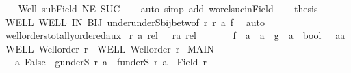 \begin{isabellebody}
\ \ \isamarkupfalse%
\ Well{\isacharprime}{\kern0pt}\ subField\ NE\ SUC\isanewline
\ \ \isamarkupfalse%
\ {\isacharparenleft}{\kern0pt}auto\ simp\ add{\isacharcolon}{\kern0pt}\ wo{\isacharunderscore}{\kern0pt}rel{\isachardot}{\kern0pt}suc{\isacharunderscore}{\kern0pt}inField{\isacharparenright}{\kern0pt}\isanewline
\ \ \isamarkupfalse%
\ {\isacharquery}{\kern0pt}thesis\isanewline
\ \ \isamarkupfalse%
\ WELL\ WELL{\isacharprime}{\kern0pt}\ IN\ BIJ\ under{\isacharunderscore}{\kern0pt}underS{\isacharunderscore}{\kern0pt}bij{\isacharunderscore}{\kern0pt}betw{\isacharbrackleft}{\kern0pt}of\ r\ r{\isacharprime}{\kern0pt}\ a\ f{\isacharbrackright}{\kern0pt}\ \isamarkupfalse%
\ auto\isanewline
{}\isamarkupfalse%
%
\endisatagproof
{\isafoldproof}%
%
\isadelimproof
\isanewline
%
\endisadelimproof
\isanewline
{}\isamarkupfalse%
\ wellorders{\isacharunderscore}{\kern0pt}totally{\isacharunderscore}{\kern0pt}ordered{\isacharunderscore}{\kern0pt}aux{}{\isacharcolon}{\kern0pt}\isanewline
{}\ r\ {\isacharcolon}{\kern0pt}{\isacharcolon}{\kern0pt}{\isachardoublequoteopen}{\isacharprime}{\kern0pt}a\ rel{\isachardoublequoteclose}\ \ \ r{\isacharprime}{\kern0pt}{\isacharcolon}{\kern0pt}{\isacharcolon}{\kern0pt}{\isachardoublequoteopen}{\isacharprime}{\kern0pt}a{\isacharprime}{\kern0pt}\ rel{\isachardoublequoteclose}\ \isanewline
\ \ \ \ \ \ f\ {\isacharcolon}{\kern0pt}{\isacharcolon}{\kern0pt}\ {\isachardoublequoteopen}{\isacharprime}{\kern0pt}a\ {\isasymRightarrow}\ {\isacharprime}{\kern0pt}a{\isacharprime}{\kern0pt}{\isachardoublequoteclose}\ \ g\ {\isacharcolon}{\kern0pt}{\isacharcolon}{\kern0pt}\ {\isachardoublequoteopen}{\isacharprime}{\kern0pt}a\ {\isasymRightarrow}\ bool{\isachardoublequoteclose}\ \ \ a{\isacharcolon}{\kern0pt}{\isacharcolon}{\kern0pt}{\isacharprime}{\kern0pt}a\isanewline
{}\ WELL{\isacharcolon}{\kern0pt}\ {\isachardoublequoteopen}Well{\isacharunderscore}{\kern0pt}order\ r{\isachardoublequoteclose}\ \ WELL{\isacharprime}{\kern0pt}{\isacharcolon}{\kern0pt}\ {\isachardoublequoteopen}Well{\isacharunderscore}{\kern0pt}order\ r{\isacharprime}{\kern0pt}{\isachardoublequoteclose}\ \isanewline
MAIN{}{\isacharcolon}{\kern0pt}\isanewline
\ \ {\isachardoublequoteopen}{\isasymAnd}\ a{\isachardot}{\kern0pt}\ {\isacharparenleft}{\kern0pt}False\ {\isasymnotin}\ g{\isacharbackquote}{\kern0pt}{\isacharparenleft}{\kern0pt}underS\ r\ a{\isacharparenright}{\kern0pt}\ {\isasymand}\ f{\isacharbackquote}{\kern0pt}{\isacharparenleft}{\kern0pt}underS\ r\ a{\isacharparenright}{\kern0pt}\ {\isasymnoteq}\ Field\ r{\isacharprime}{\kern0pt}\isanewline

\end{isabellebody}
